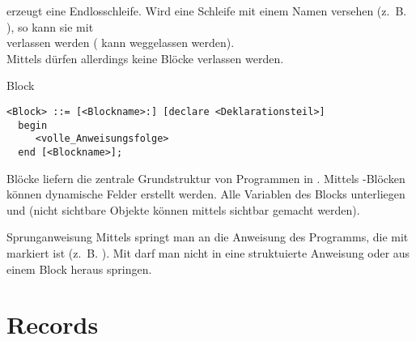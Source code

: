  erzeugt eine Endlosschleife.
Wird eine Schleife mit einem Namen versehen (z.~B.
), so kann sie mit \\
 verlassen werden
( kann weggelassen werden). \\
Mittels  dürfen allerdings keine Blöcke verlassen werden.

\begin{Def}{Block}
\begin{lstlisting}[language=ebnf,
emph={declare,begin,end},
emphstyle=\underbar]
<Block> ::= [<Blockname>:] [declare <Deklarationsteil>]
  begin
     <volle_Anweisungsfolge>
  end [<Blockname>];
\end{lstlisting}
    Blöcke liefern die zentrale Grundstruktur von Programmen in \Ada{}.
    Mittels -Blöcken können dynamische Felder erstellt werden.
    Alle Variablen des Blocks unterliegen  und
    (nicht sichtbare Objekte können mittels
    sichtbar gemacht werden).
\end{Def}

\begin{Def}{Sprunganweisung}
    Mittels  springt man an die Anweisung des Programms,
    die mit  markiert ist (z.~B. ).
    Mit  darf man nicht in eine struktuierte Anweisung oder
    aus einem Block heraus springen.
\end{Def}

\section{%
    Records%
}

